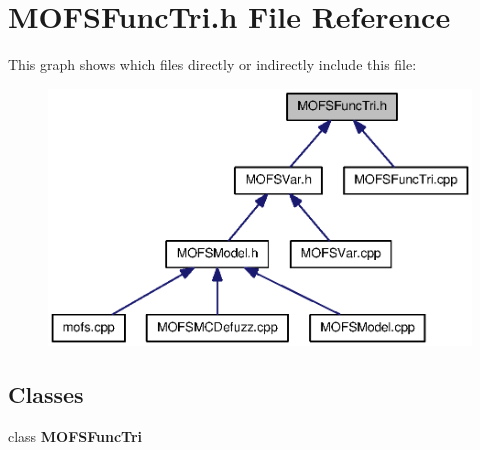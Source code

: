 \section{M\-O\-F\-S\-Func\-Tri.\-h File Reference}
\label{MOFSFuncTri_8h}
This graph shows which files directly or indirectly include this file\-:\nopagebreak
\begin{figure}[H]
\begin{center}
\leavevmode
\includegraphics[width=350pt]{MOFSFuncTri_8h__dep__incl}
\end{center}
\end{figure}
\subsection*{Classes}
\begin{DoxyCompactItemize}
\item 
class {\bf M\-O\-F\-S\-Func\-Tri}
\end{DoxyCompactItemize}
